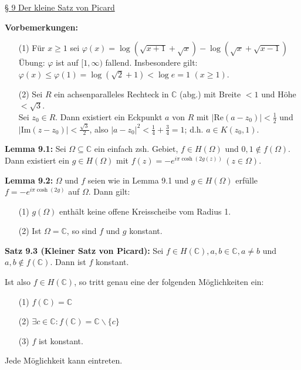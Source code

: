\documentclass[11pt]{article}
\newcommand{\C}{\mathbb{C}}
\begin{document}
\underline{§ 9 Der kleine Satz von Picard}

\textbf{Vorbemerkungen:}
\vspace{-0.6cm}  
\begin{itemize}
\item[(1)] Für $x \geq 1$ sei $\varphi(x) = \log(\sqrt{x+1} + \sqrt{x}) - \log(\sqrt{x} + \sqrt{x-1})$ \\
Übung: $\varphi$ ist auf $[1,\infty)$ fallend. Insbesondere gilt: $\varphi(x) \leq \varphi(1) = \log(\sqrt{2} + 1) < \log e = 1$ $(x \geq 1)$. \vspace{-0.2cm}
\item[(2)] Sei $R$ ein achsenparalleles Rechteck in $\C$ (abg.) mit Breite $< 1$ und Höhe $< \sqrt{3}$. \\
 Sei $z_0 \in R$. Dann existiert ein Eckpunkt $a$ von $R$ mit $|\text{Re} (a-z_0)|<\frac{1}{2}$ und $|\text{Im}(z-z_0)| < \frac{\sqrt{3}}{2}$, also $|a-z_0|^2 < \frac{1}{4} + \frac{3}{4} = 1$; d.h. $a \in K(z_0, 1)$.
\end{itemize}
\vspace{-0.3cm} 

\textbf{Lemma 9.1:} Sei $\Omega \subseteq \C$ ein einfach zsh. Gebiet, $f \in H(\Omega)$ und $0,1 \notin f(\Omega)$. Dann existiert ein $g \in H(\Omega)$ mit $f(z) = -e^{i \pi \cosh (2 g(z))} \, (z \in \Omega)$.

\textbf{Lemma 9.2:} $\Omega$ und $f$ seien wie in Lemma 9.1 und $g \in H(\Omega)$ erfülle $f = -e^{i \pi \cosh(2g)}$ auf $\Omega$. Dann gilt:
\vspace{-0.6cm}  
\begin{itemize}
\item[(1)] $g(\Omega)$ enthält keine offene Kreisscheibe vom Radius 1. \vspace{-0.2cm}
\item[(2)] Ist $\Omega = \C$, so sind $f$ und $g$ konstant. 
\end{itemize}
\vspace{-0.3cm} 

\textbf{Satz 9.3 (Kleiner Satz von Picard):} Sei $f \in H(\C), a,b \in \C, a \neq b$ und $a,b \notin f(\C)$. Dann ist $f$ konstant.

Ist also $f \in H(\C)$, so tritt genau eine der folgenden Möglichkeiten ein:
\vspace{-0.6cm}  
\begin{itemize}
\item[(1)] $f(\C) = \C$ \vspace{-0.2cm}
\item[(2)] $\exists c \in \C \colon f(\C) = \C \backslash \{ c \}$ \vspace{-0.2cm}
\item[(3)] $f$ ist konstant.
\end{itemize}
\vspace{-0.6cm} 
Jede Möglichkeit kann eintreten. 
\end{document}
